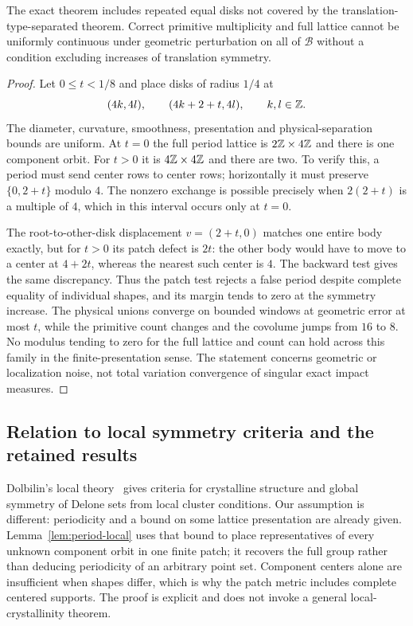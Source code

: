 \begin{proposition}
\label{prop:repeatjump}
The exact theorem includes repeated equal disks not covered by the
translation-type-separated theorem. Correct primitive multiplicity and
full lattice cannot be uniformly continuous under geometric perturbation
on all of $\mathcal B$ without a condition excluding increases of
translation symmetry.
\end{proposition}
\begin{proof}
Let $0\le t<1/8$ and place disks of radius $1/4$ at
\[
       (4k,4l),\qquad(4k+2+t,4l),\qquad k,l\in\mathbb Z.
\]
The diameter, curvature, smoothness, presentation and physical-separation
bounds are uniform. At $t=0$ the full period lattice is
$2\mathbb Z\times4\mathbb Z$ and there is one component orbit. For $t>0$ it is
$4\mathbb Z\times4\mathbb Z$ and there are two. To verify this, a period must send
center rows to center rows; horizontally it must preserve
$\{0,2+t\}$ modulo $4$. The nonzero exchange is possible precisely
when $2(2+t)$ is a multiple of $4$, which in this interval occurs only
at $t=0$.

The root-to-other-disk displacement $v=(2+t,0)$ matches one entire
body exactly, but for $t>0$ its patch defect is $2t$: the other body
would have to move to a center at $4+2t$, whereas the nearest such
center is $4$. The backward test gives the same discrepancy. Thus the
patch test rejects a false period despite complete equality of individual
shapes, and its margin tends to zero at the symmetry increase. The
physical unions converge on bounded windows at geometric error at most
$t$, while the primitive count changes and the covolume jumps from
$16$ to $8$. No modulus tending to zero for the full lattice and count
can hold across this family in the finite-presentation sense.
The statement concerns geometric or localization noise, not total
variation convergence of singular exact impact measures.
\end{proof}

\subsection{Relation to local symmetry criteria and the retained results}
Dolbilin's local theory~\cite{Dolbilin} gives criteria for crystalline
structure and global symmetry of Delone sets from local cluster
conditions. Our assumption is different: periodicity and a bound on
some lattice presentation are already given. Lemma~\ref{lem:period-local}
uses that bound to place representatives of every unknown component
orbit in one finite patch; it recovers the full group rather than
deducing periodicity of an arbitrary point set. Component centers alone
are insufficient when shapes differ, which is why the patch metric
includes complete centered supports. The proof is explicit and does not
invoke a general local-crystallinity theorem.

